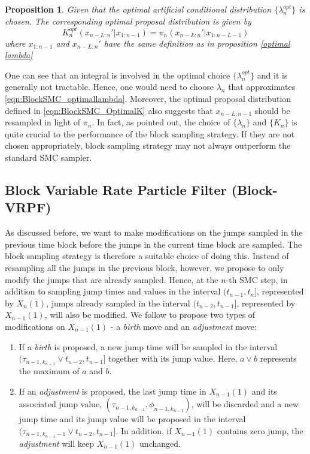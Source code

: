 \documentclass[12pt,a4paper]{article}
\newtheorem{proposition}{Proposition}
\begin{document}
\begin{proposition}\label{Optimal proposal kernel}
    Given that the optimal artificial conditional distribution \(\{\lambda_n^{opt}\}\) is chosen. The corresponding optimal proposal distribution is given by 
    \begin{equation}
        \label{eqn:BlockSMC_OptimalK} 
        K_n^{opt}(x_{n-L:n}'|x_{1:n-1}) = \pi_n(x_{n-L:n}'|x_{1:n-L-1})
    \end{equation}
    where \(x_{1:n-1}\) and \(x_{n-L:n}'\) have the same definition as in \textit{proposition} \ref{optimal lambda}
\end{proposition}
One can see that an integral is involved in the optimal choice \(\{\lambda_n^{opt}\}\) and it is generally not tractable. Hence, one would need to choose \(\lambda_n\) that approximates \eqref{eqn:BlockSMC_optimallambda}. Moreover, the optimal proposal distribution defined in \eqref{eqn:BlockSMC_OptimalK} also suggests that \(x_{n-L:n-1}\) should be resampled in light of \(\pi_n\). In fact, as \cite{doucet2006efficient} pointed out, the choice of \(\{\lambda_n\}\) and \(\{K_n\}\) is quite crucial to the performance of the block sampling strategy. If they are not chosen appropriately, block sampling strategy may not always outperform the standard SMC sampler. 
\subsection{Block Variable Rate Particle Filter (Block-VRPF)}
As discussed before, we want to make modifications on the jumps sampled in the previous time block before the jumps in the current time block are sampled. The block sampling strategy is therefore a suitable choice of doing this. Instead of resampling all the jumps in the previous block, however, we propose to only modify the jumps that are already sampled. Hence, at the $n$-th SMC step, in addition to sampling jump times and values in the interval $(t_{n-1},t_n]$, represented by $X_n(1)$, jumps already sampled in the interval $(t_{n-2},t_{n-1}]$, represented by $X_{n-1}(1)$, will also be modified. We follow \cite{whiteley2011monte} to propose two types of modifications on $X_{n-1}(1)$ - a \textit{birth} move and an \textit{adjustment} move:
\begin{enumerate}[label=\textit{Modification \arabic*.},leftmargin=*]
    \item If a \textit{birth} is proposed, a new jump time will be sampled in the interval $(\tau_{n-1,k_{n-1}}\vee t_{n-2},t_{n-1}]$ together with its jump value. Here, $a \vee b$ represents the maximum of $a$ and $b$. 
    \item If an \textit{adjustment} is proposed, the last jump time in $X_{n-1}(1)$ and its associated jump value, $\left(\tau_{n-1,k_{n-1}},\phi_{n-1,k_{n-1}}\right)$, will be discarded and a new jump time and its jump value will be proposed in the interval $(\tau_{n-1,k_{n-1}-1} \vee t_{n-2},t_{n-1}]$. In addition, if $X_{n-1}(1)$ contains zero jump, the \textit{adjustment} will keep $X_{n-1}(1)$ unchanged. 
\end{enumerate}
\end{document}
